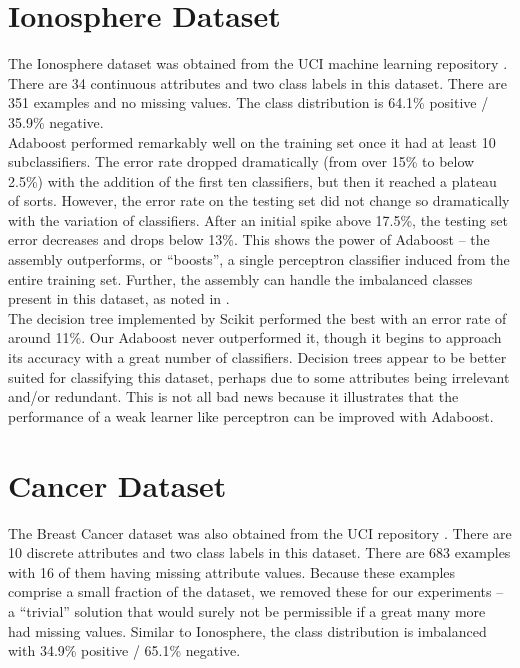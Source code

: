 \documentclass{article}
\begin{document}
\section{Ionosphere Dataset}

The Ionosphere dataset was obtained from the UCI machine learning repository \cite{ionosphere}. There are 34 continuous attributes and two class labels in this dataset. There are 351 examples and no missing values. The class distribution is 64.1\% positive / 35.9\% negative. \\

Adaboost performed remarkably well on the training set once it had at least 10 subclassifiers. The error rate dropped dramatically (from over 15\% to below 2.5\%) with the addition of the first ten classifiers, but then it reached a plateau of sorts. However, the error rate on the testing set did not change so dramatically with the variation of classifiers. After an initial spike above 17.5\%, the testing set error decreases and drops below 13\%. This shows the power of Adaboost -- the assembly outperforms, or ``boosts'', a single perceptron classifier induced from the entire training set. Further, the assembly can handle the imbalanced classes present in this dataset, as noted in \cite{sun-kamel-wang}. \\

The decision tree implemented by Scikit performed the best with an error rate of around 11\%. Our Adaboost never outperformed it, though it begins to approach its accuracy with a great  number of classifiers. Decision trees appear to be better suited for classifying this dataset, perhaps due to some attributes being irrelevant and/or redundant. This is not all bad news because it illustrates that the performance of a weak learner like perceptron can be improved with Adaboost.

\section{Cancer Dataset}

The Breast Cancer dataset was also obtained from the UCI repository \cite{cancer}. There are 10 discrete attributes and two class labels in this dataset. There are 683 examples with 16 of them having missing attribute values. Because these examples comprise a small fraction of the  dataset, we removed these for our experiments -- a ``trivial'' solution that would surely not be permissible if a great many more had missing values. Similar to Ionosphere, the class distribution is imbalanced with 34.9\% positive / 65.1\% negative. \\
\end{document}

